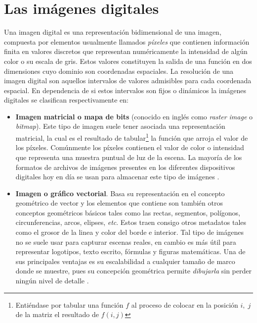 \section{Las im\'agenes digitales}\label{sec:digital_images}
Una imagen digital \cite{solomon2011fundamentals,enwiki:di,eswiki:id} es una representaci\'on bidimensional de una imagen, compuesta por elementos usualmente llamados \textit{p\'ixeles} que contienen informaci\'on finita en valores discretos que representan num\'ericamente la intensidad de alg\'un color o su escala de gris. Estos valores constituyen la salida de una funci\'on en dos dimensiones cuyo dominio son coordenadas espaciales. La resolución de una imagen digital son aquellos intervalos de valores admisibles para cada coordenada espacial. En dependencia de si estos intervalos son fijos o din\'amicos la im\'agenes digitales se clasifican respectivamente en:
\begin{itemize}
	\item \textbf{Imagen matricial o mapa de bits} (conocido en ingl\'es como \textit{raster image} o \textit{bitmap}). Este tipo de imagen suele tener asociada una representaci\'on matricial, la cual es el resultado de tabular\footnote{Entiéndase por tabular una funci\'on $f$ al proceso de colocar en la posici\'on $i,\;j$ de la matriz el resultado de $f(i, j)$} la funci\'on que arroja el valor de los p\'ixeles. Comúnmente los píxeles contienen el valor de color o intensidad que representa una muestra puntual de luz de la escena. La mayor\'ia de los formatos de archivos de im\'agenes presentes en los diferentes dispositivos digitales hoy en d\'ia se usan para almacenar este tipo de im\'agenes \cite{eswiki:imp}.
	\item \textbf{Imagen o gr\'afico vectorial}. Basa su representaci\'on en el concepto geom\'etrico de vector y los elementos que contiene son tambi\'en otros conceptos geom\'etricos b\'asicos tales como las rectas, segmentos, pol\'igonos, circunferencias, arcos, elipses, \textit{etc}. Estos traen consigo otros metadatos tales como el grosor de la linea y color del borde e interior. Tal tipo de im\'agenes no se suele usar para capturar escenas reales, en cambio es m\'as \'util para representar logotipos, texto escrito, f\'ormulas y figuras matem\'aticas. Una de sus principales ventajas es su escalabilidad a cualquier tamaño de marco donde se muestre, pues su concepci\'on geom\'etrica permite \textit{dibujarla} sin perder ning\'un nivel de detalle \cite{eswiki:igv}.
\end{itemize}

